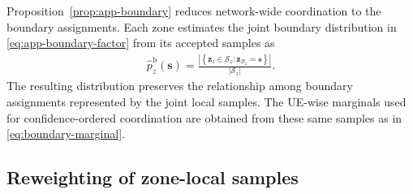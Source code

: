 \documentclass[journal]{IEEEtran}
\begin{document}
{Proposition~\ref{prop:app-boundary} reduces network-wide coordination
to the boundary assignments. Each zone estimates the joint boundary
distribution in \eqref{eq:app-boundary-factor} from its accepted
samples as
\begin{align}
\widehat p_z^{\mathrm b}(\bm s)
=
\frac{
\left|
\left\{
\bm z_z\in\mathcal S_z:
\bm z_{\mathcal B_z}=\bm s
\right\}
\right|
}{
|\mathcal S_z|
}.
\label{eq:app-empirical-boundary}
\end{align}
The resulting distribution preserves the relationship among boundary assignments represented by the joint local samples. The UE-wise marginals used for confidence-ordered coordination are obtained from these same samples as in \eqref{eq:boundary-marginal}.

\vspace{-3mm}
\subsection{Reweighting of zone-local samples}
\label{app:reweighting}

}
\end{document}
